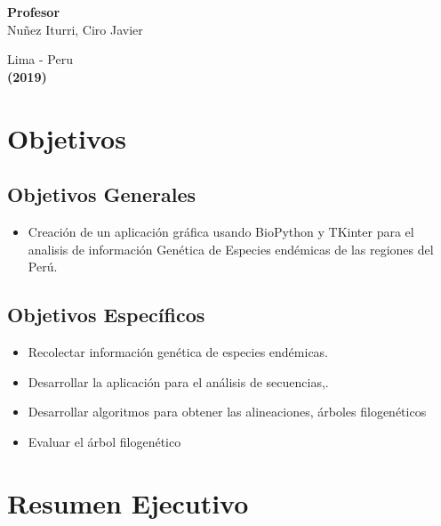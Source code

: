 \documentclass[a4paper]{article}
\begin{document}
\begin{titlepage}
\begin{center}
\begin{large}
{\bf Profesor} 
\vspace*{0.1in}
\\Nuñez Iturri, Ciro Javier
\end{large}

\end{center}
\begin{center}
\begin{large}
\vspace*{1.0in}
Lima - Peru\\
{\bf (2019)}
\end{large}
\end{center}
\end{titlepage}

\pagebreak
\tableofcontents
\pagebreak

\section{Objetivos}

\subsection{Objetivos Generales}
\begin{itemize}
\item Creación de un aplicación gráfica usando BioPython y TKinter para el analisis de información Genética de Especies endémicas de las regiones del Perú.

\end{itemize}

\subsection{Objetivos Específicos}

\begin{itemize}
\item Recolectar información genética de especies endémicas.
\item Desarrollar la aplicación para el análisis de secuencias,.
\item Desarrollar algoritmos para obtener las alineaciones, árboles filogenéticos 
\item Evaluar el árbol filogenético
\end{itemize}

\section{Resumen Ejecutivo}
\end{document}
